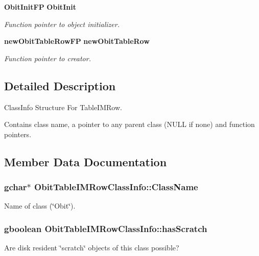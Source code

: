 \begin{CompactItemize}
{\bf Obit\-Init\-FP} {\bf Obit\-Init}
\begin{CompactList}\small\item\em Function pointer to object initializer. \item\end{CompactList}\item 
{\bf new\-Obit\-Table\-Row\-FP} {\bf new\-Obit\-Table\-Row}
\begin{CompactList}\small\item\em Function pointer to creator. \item\end{CompactList}\end{CompactItemize}


\subsection{Detailed Description}
Class\-Info Structure For Table\-IMRow. 

Contains class name, a pointer to any parent class (NULL if none) and function pointers. 



\subsection{Member Data Documentation}
\subsubsection{\setlength{\rightskip}{0pt plus 5cm}gchar$\ast$ {\bf Obit\-Table\-IMRow\-Class\-Info::Class\-Name}}\label{structObitTableIMRowClassInfo_o2}


Name of class (\char`\"{}Obit\char`\"{}). 

\subsubsection{\setlength{\rightskip}{0pt plus 5cm}gboolean {\bf Obit\-Table\-IMRow\-Class\-Info::has\-Scratch}}\label{structObitTableIMRowClassInfo_o1}


Are disk resident \char`\"{}scratch\char`\"{} objects of this class possible? 

